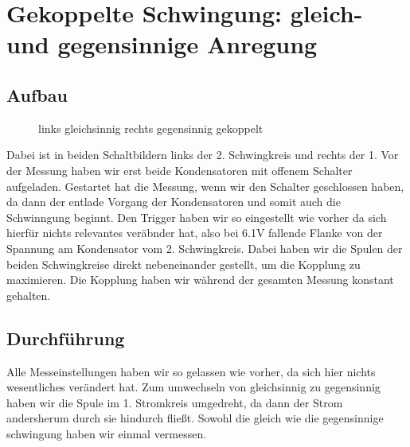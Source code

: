 \documentclass[twoside]{protokoll}
\begin{document}
\section{Gekoppelte Schwingung: gleich- und gegensinnige Anregung}
\subsection{Aufbau}
\begin{figure}[H]
    \centering
    \hfill
    \caption{links gleichsinnig rechts gegensinnig gekoppelt}
\end{figure}
Dabei ist in beiden Schaltbildern links der 2. Schwingkreis und rechts der 1.
Vor der Messung haben wir erst beide Kondensatoren mit offenem Schalter aufgeladen.
Gestartet hat die Messung, wenn wir den Schalter geschlossen haben, da dann der entlade Vorgang der Kondensatoren und somit auch die Schwinngung beginnt.
Den Trigger haben wir so eingestellt wie vorher da sich hierfür nichts relevantes veräbnder hat, also bei 6.1V fallende Flanke von der Spannung am Kondensator vom 2. Schwingkreis.
Dabei haben wir die Spulen der beiden Schwingkreise direkt nebeneinander gestellt, um die Kopplung zu maximieren.
Die Kopplung haben wir während der gesamten Messung konstant gehalten.

\subsection{Durchführung}
Alle Messeinstellungen haben wir so gelassen wie vorher, da sich hier nichts wesentliches verändert hat.
Zum umwechseln von gleichsinnig zu gegensinnig haben wir die Spule im 1. Stromkreis umgedreht, da dann der Strom andersherum durch sie hindurch fließt.
Sowohl die gleich wie die gegensinnige schwingung haben wir einmal vermessen.
\end{document}
